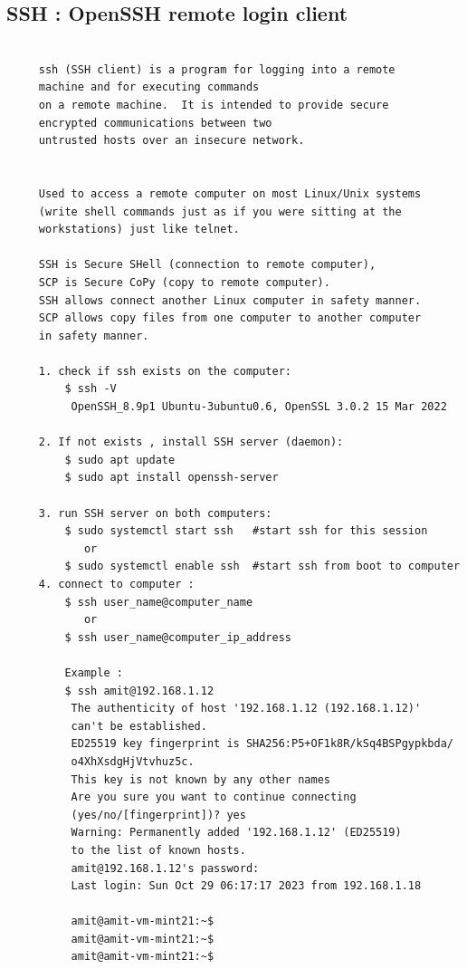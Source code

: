 \documentclass[a4paper,12pt]{article}
\begin{document}
\subsection{SSH : OpenSSH remote login client}
\begin{verbatim}
     
     ssh (SSH client) is a program for logging into a remote 
     machine and for executing commands
     on a remote machine.  It is intended to provide secure 
     encrypted communications between two
     untrusted hosts over an insecure network.
     
     
     Used to access a remote computer on most Linux/Unix systems
     (write shell commands just as if you were sitting at the 
     workstations) just like telnet.
     
     SSH is Secure SHell (connection to remote computer), 
     SCP is Secure CoPy (copy to remote computer).
     SSH allows connect another Linux computer in safety manner.
     SCP allows copy files from one computer to another computer 
     in safety manner.
     
     1. check if ssh exists on the computer:
         $ ssh -V     
          OpenSSH_8.9p1 Ubuntu-3ubuntu0.6, OpenSSL 3.0.2 15 Mar 2022
     
     2. If not exists , install SSH server (daemon): 
         $ sudo apt update        
         $ sudo apt install openssh-server
     
     3. run SSH server on both computers: 
         $ sudo systemctl start ssh   #start ssh for this session 
            or
         $ sudo systemctl enable ssh  #start ssh from boot to computer  
     4. connect to computer : 
         $ ssh user_name@computer_name
            or
         $ ssh user_name@computer_ip_address  
         
         Example : 
         $ ssh amit@192.168.1.12
          The authenticity of host '192.168.1.12 (192.168.1.12)' 
          can't be established.
          ED25519 key fingerprint is SHA256:P5+OF1k8R/kSq4BSPgypkbda/
          o4XhXsdgHjVtvhuz5c.
          This key is not known by any other names
          Are you sure you want to continue connecting 
          (yes/no/[fingerprint])? yes
          Warning: Permanently added '192.168.1.12' (ED25519) 
          to the list of known hosts.
          amit@192.168.1.12's password: 
          Last login: Sun Oct 29 06:17:17 2023 from 192.168.1.18
         
          amit@amit-vm-mint21:~$ 
          amit@amit-vm-mint21:~$ 
          amit@amit-vm-mint21:~$ 
          

\end{verbatim}
\end{document}
